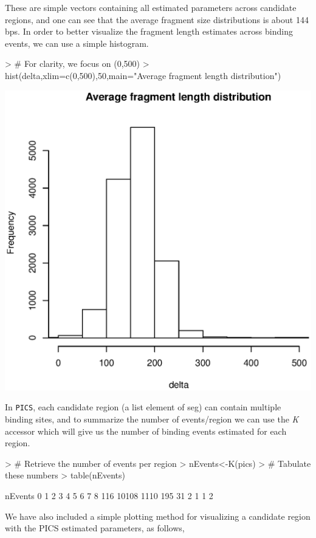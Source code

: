 \documentclass[12pt]{article}
\newcommand{\Rpackage}[1]{\texttt{#1}}
\newcommand{\Rmethod}[1]{\textit{#1}}
\begin{document}
These are simple vectors containing all estimated parameters across candidate regions, and one can see that the average fragment size distributions is about 144 bps. In order to better visualize the fragment length estimates across binding events, we can use a simple histogram.
\begin{Schunk}
\begin{Sinput}
> # For clarity, we focus on (0,500)
> hist(delta,xlim=c(0,500),50,main="Average fragment length distribution")
\end{Sinput}
\end{Schunk}
\includegraphics{chipData_AD-PICS-fragment-length-distribution}

In \Rpackage{PICS}, each candidate region (a list element of seg) can contain multiple binding sites, and to summarize the number of events/region we can use the \Rmethod{K} accessor which will give us the number of binding events estimated for each region.
\begin{Schunk}
\begin{Sinput}
> # Retrieve the number of events per region
> nEvents<-K(pics)
> # Tabulate these numbers
> table(nEvents)
\end{Sinput}
\begin{Soutput}
nEvents
    0     1     2     3     4     5     6     7     8 
  116 10108  1110   195    31     2     1     1     2 
\end{Soutput}
\end{Schunk}
We have also included a simple plotting method for visualizing a candidate region with the PICS estimated parameters, as follows,
\end{document}
